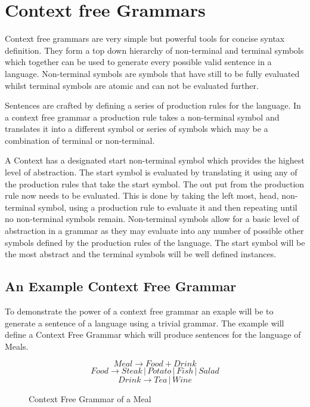 \section{Context free Grammars}

Context free grammars are very simple but powerful tools for concise syntax definition.  They form a top down hierarchy of non-terminal and terminal symbols which together can be used to generate every possible valid sentence in a language.  Non-terminal symbols are symbols that have still to be fully evaluated whilst terminal symbols are atomic and can not be evaluated further. 





Sentences are crafted by defining a series of production rules for the language.  In a context free grammar a production rule takes a non-terminal symbol and translates it into a different symbol or series of symbols which may be a combination of terminal or non-terminal. 



A Context has a designated start non-terminal symbol which provides the highest level of abstraction.  The start symbol is evaluated by translating it using any of the production rules that take the start symbol.  The out put from the production rule now needs to be evaluated.  This is done by taking the left most, head, non-terminal symbol, using a production rule to evaluate it and then repeating until no non-terminal symbols remain. 
Non-terminal symbols allow for a basic level of abstraction in a grammar as they may evaluate into any number of possible other symbols defined by the production rules of the language.  The start symbol will be the most abstract and the terminal symbols will be well defined instances. 

\subsection{An Example Context Free Grammar}

To demonstrate the power of a context free grammar an exaple will be  to generate a sentence of a language using a trivial grammar.  The example will  define a Context Free Grammar which will produce sentences for the language of Meals.  

\begin{figure}[H]
\[ Meal \to Food + Drink \]
\[ Food \to Steak \,|\, Potato \,|\, Fish \,|\, Salad \]
\[ Drink \to Tea \,|\, Wine \]

\caption{Context Free Grammar of a Meal}
\end{figure}

